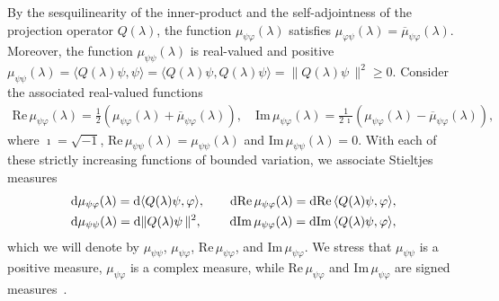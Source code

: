 \documentclass[leqno,onefignum,onetabnum]{siamltex1213}
\renewcommand{\d}{\mathrm{d}}
\newcommand\Real{\mbox{Re}\,} %
\newcommand\Imag{\mbox{Im}\,} %
\begin{document}
By the sesquilinearity of the
inner-product and the self-adjointness of the projection operator
$Q(\lambda)$, the function $\mu_{\psi\varphi}(\lambda)$ satisfies
$\mu_{\varphi\psi}(\lambda)=\overline{\mu}_{\psi\varphi}(\lambda)$. Moreover, the function $\mu_{\psi\psi}(\lambda)$
is real-valued and positive
$\mu_{\psi\psi}(\lambda)=\langle Q(\lambda)\psi,\psi\rangle=\langle Q(\lambda)\psi,Q(\lambda)\psi\rangle=\|Q(\lambda)\psi\,\|^2\geq0$. 
Consider the associated real-valued functions   
%
\begin{align}\label{eq:Fns_Bounded_Var}
  \Real\mu_{\psi\varphi}(\lambda)
         =\frac{1}{2}\left(\mu_{\psi\varphi}(\lambda)+\overline{\mu}_{\psi\varphi}(\lambda)\right), \quad
  \Imag\mu_{\psi\varphi}(\lambda)
         =\frac{1}{2\,\imath}\left(\mu_{\psi\varphi}(\lambda)-\overline{\mu}_{\psi\varphi}(\lambda)\right),
\end{align}
%
where $\imath=\sqrt{-1}$, $\Real\mu_{\psi\psi}(\lambda)=\mu_{\psi\psi}(\lambda)$ and
$\Imag\mu_{\psi\psi}(\lambda)=0$. With each of these strictly increasing functions
of bounded variation, we associate Stieltjes
measures~\cite{Stieltjes:1995,Stone:64,Folland:99:RealAnalysis}  
%
\begin{align}\label{eq:Bounded_Variation}
  &\d\mu_{\psi\varphi}(\lambda)=\d\langle Q(\lambda)\psi,\varphi\rangle, \qquad
  \d\Real\mu_{\psi\varphi}(\lambda)=\d\Real\langle Q(\lambda)\psi,\varphi\rangle,\\  
  &\d\mu_{\psi\psi}(\lambda)=\d\|Q(\lambda)\psi\,\|^2, \qquad
  \hspace{0.2em}
  \d\Imag\mu_{\psi\varphi}(\lambda)=\d\Imag\langle Q(\lambda)\psi,\varphi\rangle,
  \notag
\end{align}
%
which we will denote by $\mu_{\psi\psi}$, $\mu_{\psi\varphi}$, $\Real\mu_{\psi\varphi}$, and
$\Imag\mu_{\psi\varphi}$. We stress that $\mu_{\psi\psi}$ is a positive measure, $\mu_{\psi\varphi}$
is a complex measure, while $\Real\mu_{\psi\varphi}$ and $\Imag\mu_{\psi\varphi}$ are signed
measures~\cite{Stieltjes:1995,Stone:64}.  
\end{document}
